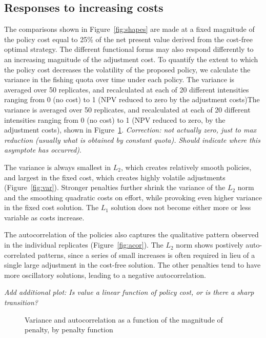 \documentclass[authoryear, review, 12pt]{elsarticle}
\newcommand{\cdb}[1]{{\it \color{darkgreen} #1}}
\begin{document}
\subsection{Responses to increasing costs}

The comparisons shown in Figure~\ref{fig:shapes} are made at a fixed magnitude of the policy cost equal to 25\% of the net present value derived from the cost-free optimal strategy. The different functional forms may also respond differently to an increasing magnitude of the adjustment cost.  To quantify the extent to which the policy cost decreases the volatility of the proposed policy, we calculate the variance in the fishing quota over time under each policy. The variance is averaged over 50 replicates, and recalculated at each of 20 different intensities ranging from 0 (no cost) to 1 (NPV reduced to zero by the adjustment costs)The variance is averaged over 50 replicates, and recalculated at each of 20 different intensities ranging from 0 (no cost) to 1 (NPV reduced to zero, by the adjustment costs), shown in Figure~\ref{fig:summarystats}. \cdb{Correction: not actually zero, just to max reduction (usually what is obtained by constant quota).  Should indicate where this asymptote has occurred)}. 

The variance is always smallest in $L_2$, which creates relatively smooth policies, and largest in the fixed cost, which creates highly volatile adjustments (Figure~\ref{fig:var}).  Stronger penalties further shrink the variance of the $L_2$ norm and the smoothing quadratic costs on effort, while provoking even higher variance in the fixed cost solution.  The $L_1$ solution does not become either more or less variable as costs increase.  

The autocorrelation of the policies also captures the qualitative pattern observed in the individual replicates (Figure~\ref{fig:acor}).  The $L_2$ norm shows postively auto-correlated patterns, since a series of small increases is often required in lieu of a single large adjustment in the cost-free solution.  The other penalties tend to have more oscillatory solutions, leading to a negative autocorrelation.  



\cdb{Add additional plot: Is value a linear function of policy cost, or is there a sharp transition? }




\begin{figure}
  \begin{center}
    \caption{Variance and autocorrelation as a function of the magnitude of penalty, by penalty function}\label{fig:summarystats}
  \end{center}
\end{figure}
\end{document}
